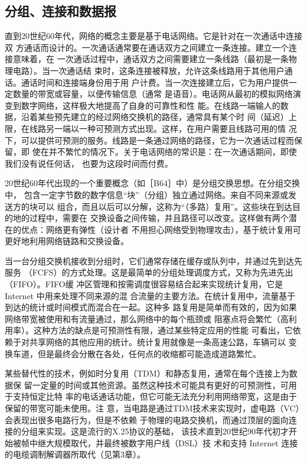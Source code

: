 \subsection{分组、连接和数据报}
直到20世纪60年代，网络的概念主要是基于电话网络。它是针对在一次通话中连接双
方通话而设计的。一次通话通常要在通话双方之间建立一条连接。建立一个连接意味着，在
一次通话过程中，通话双方之间需要建立一条线路（最初是一条物理电路）。当一次通话结
束时，这条连接被释放，允许这条线路用于其他用户通话。通话时间和连接端身份用于用
户计费。当一次连接建立后，它为用户提供一定数量的带宽或容量，以便传输信息（通常
是语音）。电话网从最初的模拟网络演变到数字网络，这样极大地提高了自身的可靠性和性
能。在线路一端输人的数据，沿着某些预先建立的经过网络交换机的路径，通常具有某个时
间（延迟）上限，在线路另一端以一种可预测方式出现。这样，在用户需要且线路可用的情
况下，可以提供可预测的服务。线路是一条通过网络的路径，它为一次通话过程而保留，即
使在并不繁忙的情况下。关于电话网络的常识是：在一次通话期间，即使我们没有说任何话，
也要为这段时间而付费。

20世纪60年代出现的一个重要概念（如［B64］中）是分组交换思想。在分组交换中，
包含一定字节数的数字信息“块”（分组）独立通过网络。来自不同来源或发送方的块可以
组合，而且以后可以分解，这称为“（多路）复用”。这些块在到达目的地的过程中，需要在
交换设备之间传输，并且路径可以改变。这样做有两个潜在的优点：网络更有弹性（设计者
不用担心网络受到物理攻击），基于统计复用可更好地利用网络链路和交换设备。

当一台分组交换机接收到分组时，它们通常存储在缓存或队列中，并通过先到达先服务
（FCFS）的方式处理。这是最简单的分组处理调度方式，又称为先进先出（FIFO）。FIFO缓
冲区管理和按需调度很容易结合起来实现统计复用，它是 Internet 中用来处理不同来源的混
合流量的主要方法。在统计复用中，流量基于到达的统计或时间模式而混合在一起。这种多
路复用是简单而有效的，因为如果网络带宽被使用和有流量通过，那么网络中的每个瓶颈或
阻塞点将会繁忙（高利用率）。这种方法的缺点是可预测性有限，通过某些特定应用的性能
可看出，它依赖于对共享网络的其他应用的统计。统计复用就像是一条高速公路，车辆可以
变换车道，但是最终会分散在各处，任何点的收缩都可能造成道路繁忙。

某些替代性的技术，例如时分复用（TDM）和静态复用，通常在每个连接上为数据保
留一定量的时间或其他资源。虽然这种技术可能具有更好的可预测性，可用于支持恒定比特
率的电话通话功能，但它可能无法充分利用网络带宽，这是由于保留的带宽可能未使用。注
意，当电路是通过TDM技术来实现时，虚电路（VC）会表现出很多电路行为，但是不依赖
于物理的电路交换机，而通过顶层的面向连接的分组来实现。这是流行的X.25协议的基础，
该技术直到20世纪90年代初才开始被帧中继大规模取代，并最终被数字用户线（DSL）技
术和支持 Internet 连接的电缆调制解调器所取代（见第3章）。

